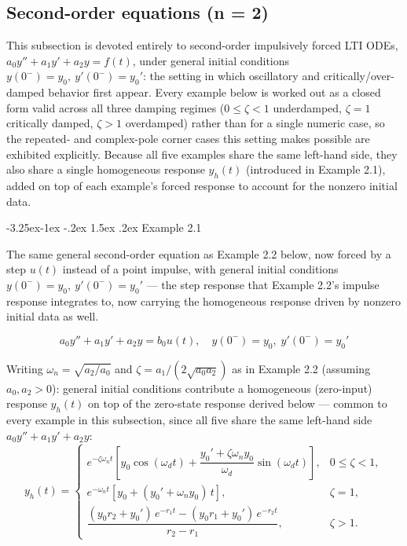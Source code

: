 \documentclass[
  11pt,
]{article}
\makeatletter
\renewcommand\paragraph{\@startsection{paragraph}{4}{\z@}%
                                     {-3.25ex\@plus -1ex \@minus -.2ex}%
                                     {1.5ex \@plus .2ex}%
                                     {\normalfont\normalsize\bfseries}}
\makeatother
\begin{document}
\hypertarget{extended-n2}{%
\subsection{Second-order equations (n = 2)}\label{extended-n2}}

This subsection is devoted entirely to second-order impulsively forced
LTI ODEs, \(a_0 y'' + a_1 y' + a_2 y = f(t)\), under general initial
conditions \(y(0^-)=y_0,\ y'(0^-)=y_0'\): the setting in which
oscillatory and critically/over-damped behavior first appear. Every
example below is worked out as a closed form valid across all three
damping regimes (\(0 \leq \zeta < 1\) underdamped, \(\zeta = 1\)
critically damped, \(\zeta > 1\) overdamped) rather than for a single
numeric case, so the repeated- and complex-pole corner cases this
setting makes possible are exhibited explicitly. Because all five
examples share the same left-hand side, they also share a single
homogeneous response \(y_h(t)\) (introduced in Example 2.1), added on
top of each example's forced response to account for the nonzero initial
data.

\hypertarget{example-2.1}{%
\paragraph{Example 2.1}\label{example-2.1}}

The same general second-order equation as Example 2.2 below, now forced
by a step \(u(t)\) instead of a point impulse, with general initial
conditions \(y(0^-)=y_0,\ y'(0^-)=y_0'\) --- the step response that
Example 2.2's impulse response integrates to, now carrying the
homogeneous response driven by nonzero initial data as well.

\[
a_0 y'' + a_1 y' + a_2 y = b_0 u(t), \quad y(0^-) = y_0, \; y'(0^-) = y_0'
\]

Writing \(\omega_n = \sqrt{a_2/a_0}\) and
\(\zeta = a_1/(2\sqrt{a_0 a_2})\) as in Example 2.2 (assuming
\(a_0, a_2 > 0\)): general initial conditions contribute a homogeneous
(zero-input) response \(y_h(t)\) on top of the zero-state response
derived below --- common to every example in this subsection, since all
five share the same left-hand side \(a_0y''+a_1y'+a_2y\): \[
y_h(t) = \begin{cases}
e^{-\zeta\omega_n t}\left[y_0\cos(\omega_d t) + \dfrac{y_0' + \zeta\omega_n y_0}{\omega_d}\sin(\omega_d t)\right], & 0 \leq \zeta < 1,\\[2mm]
e^{-\omega_n t}\left[y_0 + (y_0' + \omega_n y_0)\, t\right], & \zeta = 1,\\[2mm]
\dfrac{(y_0 r_2 + y_0')\, e^{-r_1 t} - (y_0 r_1 + y_0')\, e^{-r_2 t}}{r_2 - r_1}, & \zeta > 1.
\end{cases}
\]
\end{document}
